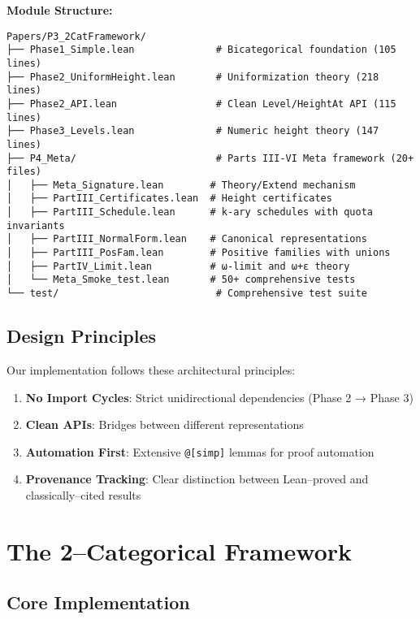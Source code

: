 \documentclass[11pt]{article}
\theoremstyle{definition}
\theoremstyle{remark}
\begin{document}
\begin{mdframed}[style=technical]
\textbf{Module Structure:}
\begin{lstlisting}[language={}]
Papers/P3_2CatFramework/
├── Phase1_Simple.lean              # Bicategorical foundation (105 lines)
├── Phase2_UniformHeight.lean       # Uniformization theory (218 lines)
├── Phase2_API.lean                 # Clean Level/HeightAt API (115 lines)
├── Phase3_Levels.lean              # Numeric height theory (147 lines)
├── P4_Meta/                        # Parts III-VI Meta framework (20+ files)
│   ├── Meta_Signature.lean        # Theory/Extend mechanism
│   ├── PartIII_Certificates.lean  # Height certificates
│   ├── PartIII_Schedule.lean      # k-ary schedules with quota invariants
│   ├── PartIII_NormalForm.lean    # Canonical representations
│   ├── PartIII_PosFam.lean        # Positive families with unions
│   ├── PartIV_Limit.lean          # ω-limit and ω+ε theory
│   └── Meta_Smoke_test.lean       # 50+ comprehensive tests
└── test/                           # Comprehensive test suite
\end{lstlisting}
\end{mdframed}

\subsection{Design Principles}

Our implementation follows these architectural principles:

\begin{enumerate}
\item \textbf{No Import Cycles}: Strict unidirectional dependencies (Phase 2 → Phase 3)
\item \textbf{Clean APIs}: Bridges between different representations
\item \textbf{Automation First}: Extensive \texttt{@[simp]} lemmas for proof automation
\item \textbf{Provenance Tracking}: Clear distinction between Lean--proved and classically--cited results
\end{enumerate}

\section{The 2--Categorical Framework}

\subsection{Core Implementation}
\end{document}

